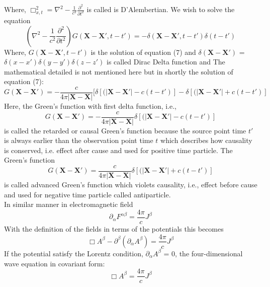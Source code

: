 \documentclass[fleqn,a4paper,12pt,oneside]{article}
\begin{document}
Where, ${\Box_{x,t}^2} = \nabla^{2} -
\frac{1}{c^2}\frac{{\partial}^2}{{\partial}t^2}$ is called is
D'Alembertian. We wish to solve the equation
\begin{equation}
(\nabla^{2} - \frac{1}{c^2}\frac{{\partial}^2}{{\partial}t^2})G(\textbf{X}-\textbf{X}',
t-t') =
- {\delta}(\textbf{X}-\textbf{X}', t-t')\delta(t - t')
\end{equation}
Where, $G(\textbf{X}-\textbf{X}', t-t')$ is the solution of
equation (7) and $\delta(\textbf{X}-\textbf{X}')$ = $\delta(x -
x')\delta(y - y')\delta(z -z')$ is called Dirac Delta function and
The mathematical detailed is not mentioned here but in shortly the
solution of equation (7):
\begin{equation}
G(\textbf{X}-\textbf{X}') = - \frac{c}{4{\pi}|\textbf{X} -
	\textbf{X}|}[\delta[(|\textbf{X}-\textbf{X}'| - c(t - t')] -
\delta[(|\textbf{X}-\textbf{X}'| + c(t - t')]
\end{equation}
Here, the Green's function with first delta function, i.e.,
\begin{equation}
G(\textbf{X}-\textbf{X}') = - \frac{c}{4{\pi}|\textbf{X} -
	\textbf{X}|}\delta[(|\textbf{X}-\textbf{X}'| - c(t - t')]
\end{equation}
is called the retarded or causal Green's function because the
source point time $t'$ is always earlier than the observation
point time $t$ which describes how causality is conserved, i.e.
effect after cause and used for positive time particle. The
Green's function
\begin{equation}
G(\textbf{X}-\textbf{X}') =  \frac{c}{4{\pi}|\textbf{X} -
	\textbf{X}|}\delta[(|\textbf{X}-\textbf{X}'| + c(t - t')]
\end{equation} is called advanced Green's function which violets
causality, i.e., effect before cause and used for negative time
particle called antiparticle.
\\In similar manner in electromagnetic field
\begin{equation}\label{1}
{{\partial}_{\alpha}}F^{\alpha\beta}=\frac{4\pi}{c} J^{\beta}
\end{equation}
With the definition of the fields in terms of the potentials this
becomes
\begin{equation}\label{1}
{\Box}A^{\beta} - \partial^{\beta}(\partial_{\alpha}A^{\beta}) =
\frac{4\pi}{c}J^{\beta}
\end{equation}
If the potential satisfy the Lorentz condition,
${\partial}_{\alpha}A^{\beta}$ = 0, the four-dimensional wave
equation in covariant form: \begin{equation}\label{1}
{\Box}A^{\beta} = \frac{4\pi}{c}J^{\beta}
\end{equation}
\end{document}
